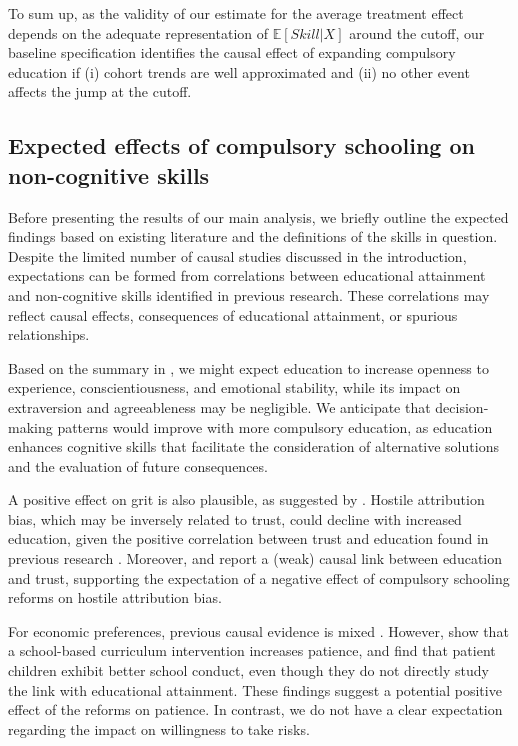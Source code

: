 To sum up, as the validity of our estimate for the average treatment effect depends on the adequate representation of $\mathbb{E}[Skill|X]$ around the cutoff, our baseline specification identifies the causal effect of expanding compulsory education if (i) cohort trends are well approximated and (ii) no other event affects the jump at the cutoff.


\subsection{Expected effects of compulsory schooling on non-cognitive skills} \label{subsec:exp_effects}

Before presenting the results of our main analysis, we briefly outline the expected findings based on existing literature and the definitions of the skills in question. Despite the limited number of causal studies discussed in the introduction, expectations can be formed from correlations between educational attainment and non-cognitive skills identified in previous research. These correlations may reflect causal effects, consequences of educational attainment, or spurious relationships.

Based on the summary in \citet{almlund_chapter_2011}, we might expect education to increase openness to experience, conscientiousness, and emotional stability, while its impact on extraversion and agreeableness may be negligible. We anticipate that decision-making patterns would improve with more compulsory education, as education enhances cognitive skills that facilitate the consideration of alternative solutions and the evaluation of future consequences.

A positive effect on grit is also plausible, as suggested by \citet{alan_ever_2019}. Hostile attribution bias, which may be inversely related to trust, could decline with increased education, given the positive correlation between trust and education found in previous research \parencite{oreopoulos_priceless_2011, charron_does_2016}. Moreover, \citet{yang_does_2019} and \citet{kan_educated_2021} report a (weak) causal link between education and trust, supporting the expectation of a negative effect of compulsory schooling reforms on hostile attribution bias.

For economic preferences, previous causal evidence is mixed \parencite{dohmen_effect_2022, tawiah_does_2022, jung_does_2015, jung_does_2021}. However, \citet{alan_fostering_2018} show that a school-based curriculum intervention increases patience, and \citet{sutter_impatience_2013} find that patient children exhibit better school conduct, even though they do not directly study the link with educational attainment. These findings suggest a potential positive effect of the reforms on patience. In contrast, we do not have a clear expectation regarding the impact on willingness to take risks.

